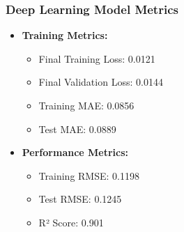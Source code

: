 \documentclass[12pt,a4paper]{report}
\begin{document}
\subsubsection{Deep Learning Model Metrics}
\begin{itemize}
    \item \textbf{Training Metrics:}
    \begin{itemize}
        \item Final Training Loss: 0.0121
        \item Final Validation Loss: 0.0144
        \item Training MAE: 0.0856
        \item Test MAE: 0.0889
    \end{itemize}
    
    \item \textbf{Performance Metrics:}
    \begin{itemize}
        \item Training RMSE: 0.1198
        \item Test RMSE: 0.1245
        \item R² Score: 0.901
    \end{itemize}
\end{itemize}
\end{document}
